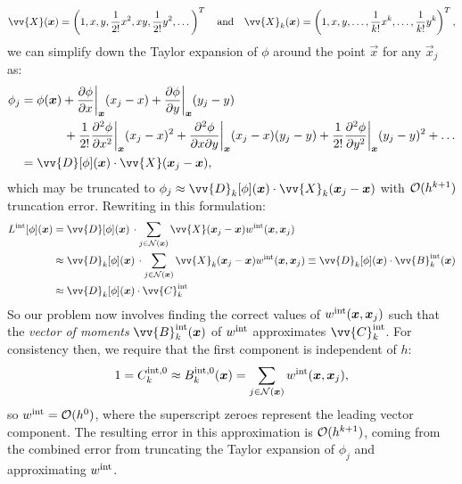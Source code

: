 \begin{equation}
\vv{X}(\vec{x}) = \left(1, x, y, \frac{1}{2!} x^2, xy, \frac{1}{2!} y^2, \dots \right)^T
\quad \text{and} \quad
\vv{X}_k(\vec{x}) = \left(1, x, y, \dots, \frac{1}{k!} x^k, \dots, \frac{1}{k!} y^k \right)^T,
\end{equation}
we can simplify down the Taylor expansion of $\phi$ around the point $\vec{x}$ for any $\vec{x}_j$ as:
\begin{subequations}
\begin{align}
\phi_j &= \phi(\vec{x}) + \pdv{\phi}{x}\bigg|_{\vec{x}} (x_j - x) + \pdv{\phi}{y} \bigg|_{\vec{x}} (y_j - y)  \\
& \qquad  \quad \ \, + \frac{1}{2!} \pdv[2]{\phi}{x}\bigg|_{\vec{x}} (x_j - x)^2 + \pdv[2]{\phi}{x}{y}\bigg|_{\vec{x}} (x_j - x) (y_j - y) + \frac{1}{2!} \pdv[2]{\phi}{y}\bigg|_{\vec{x}} (y_j - y)^2 + \dots \\
&= \vv{D}[\phi](\vec{x}) \cdot \vv{X} (\vec{x}_j - \vec{x}),
\end{align}
\end{subequations}
which may be truncated to $\phi_j \approx \vv{D}_k[\phi](\vec{x}) \cdot \vv{X}_k (\vec{x}_j - \vec{x})$ with $\cl{O}(h^{k + 1})$ truncation error. Rewriting  in this formulation:
\begin{subequations}
\begin{align}
L^{\rm{int}}[\phi](\vec{x}) &= \vv{D}[\phi](\vec{x}) \, \cdot \sum_{j \in \cl{N}(\vec{x})} \vv{X} (\vec{x}_j - \vec{x}) w^{\rm{int}}(\vec{x}, \vec{x}_j) \\
&\approx \vv{D}_k[\phi](\vec{x}) \, \cdot \sum_{j \in \cl{N}(\vec{x})} \vv{X}_k (\vec{x}_j - \vec{x}) w^{\rm{int}}(\vec{x}, \vec{x}_j) \equiv \vv{D}_k[\phi](\vec{x}) \cdot \vv{B}_k^\rm{int}(\vec{x}) \\
&\approx \vv{D}_k[\phi](\vec{x}) \cdot \vv{C}_k^{\rm{int}}
\end{align}
\end{subequations}
So our problem now involves finding the correct values of $w^{\rm{int}}(\vec{x}, \vec{x}_j)$ such that the \emph{vector of moments} $\vv{B}_k^{\rm{int}}(\vec{x})$ of $w^{\rm{int}}$ approximates $\vv{C}_k^\rm{int}$. For consistency then, we require that the first component is independent of $h$:
\begin{equation}
1 = C_k^{\rm{int}, 0} \approx B_k^{\rm{int}, 0}(\vec{x}) = \sum_{j \in \cl{N}(\vec{x})} w^{\rm{int}} (\vec{x}, \vec{x}_j),
\end{equation}
so $w^{\rm{int}} = \cl{O}(h^0)$, where the superscript zeroes represent the leading vector component. The resulting error in this approximation is $\cl{O}(h^{k + 1})$, coming from the combined error from truncating the Taylor expansion of $\phi_j$ and approximating $w^{\rm{int}}$.

